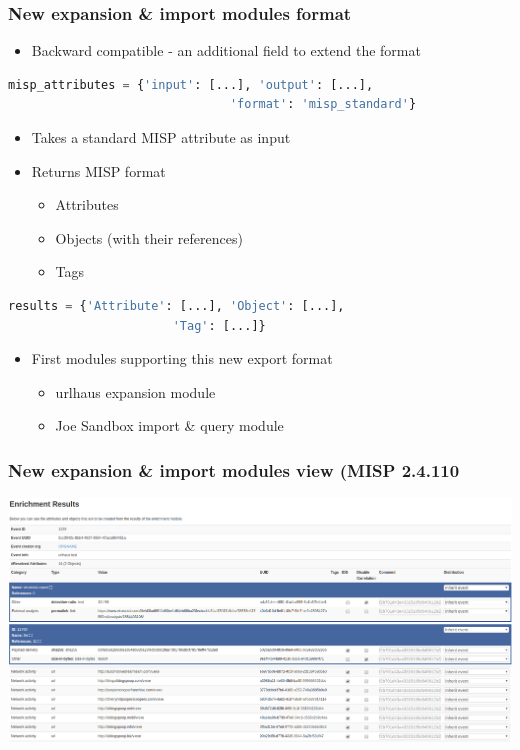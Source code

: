 \begin{frame}[fragile]
    \frametitle{New expansion \& import modules format}
    \begin{itemize}
        \item Backward compatible - an additional field to extend the format
    \end{itemize}
    \begin{adjustbox}{width=\textwidth,height=5cm,keepaspectratio}
        \begin{lstlisting}[language=python]
            misp_attributes = {'input': [...], 'output': [...],
                               'format': 'misp_standard'}
        \end{lstlisting}
    \end{adjustbox}
    \begin{itemize}
        \item Takes a standard MISP attribute as input
        \item Returns MISP format
        \begin{itemize}
            \item Attributes
            \item Objects (with their references)
            \item Tags
        \end{itemize}
    \end{itemize}
    \begin{adjustbox}{width=\textwidth,height=5cm,keepaspectratio}
        \begin{lstlisting}[language=python]
            results = {'Attribute': [...], 'Object': [...],
                       'Tag': [...]}
        \end{lstlisting}
    \end{adjustbox}
    \begin{itemize}
        \item First modules supporting this new export format
            \begin{itemize}
                \item urlhaus expansion module
                \item Joe Sandbox import \& query module
            \end{itemize}
    \end{itemize}
\end{frame}

\begin{frame}[fragile]
        \frametitle{New expansion \& import modules view (MISP 2.4.110}
    \includegraphics[scale=0.2]{new_format_view.png}
\end{frame}


